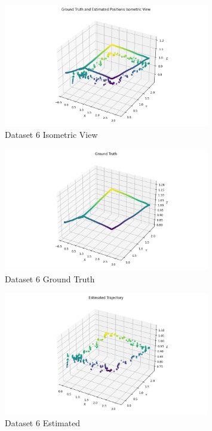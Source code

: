 \documentclass{article}
\begin{document}
\begin{figure}[H]
    \centering
    \includegraphics[width=0.8\textwidth]{./imgs/task1_2/studentdata6_isometric.png}
    \caption{Dataset 6 Isometric View}
\end{figure}

\begin{figure}[H]
    \centering
    \includegraphics[width=0.8\textwidth]{./imgs/task1_2/studentdata6_ground_truth.png}
    \caption{Dataset 6 Ground Truth}
\end{figure}

\begin{figure}[H]
    \centering
    \includegraphics[width=0.8\textwidth]{./imgs/task1_2/studentdata6_estimated.png}
    \caption{Dataset 6 Estimated}
\end{figure}
\end{document}
